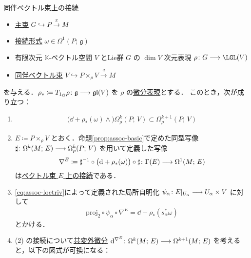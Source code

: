 \documentclass[geometry_main]{subfiles}
\begin{document}
\begin{mytheo}[label=thm:connection-assoc,breakable]{同伴ベクトル束上の接続}
    \begin{itemize}
        \item \hyperref[def.PFD]{主束} $G \hookrightarrow P \xrightarrow{\pi} M$
        \item \hyperref[def:connection]{接続形式} $\omega \in \Omega^1(P;\, \mathfrak{g})$
        \item 有限次元 $\mathbb{K}$-ベクトル空間 $V$ とLie群 $G$ の $\dim V$ 次元表現 $\rho \colon G \lto \LGL (V)$ 
        \item \hyperref[def:associated-vect]{同伴ベクトル束} $V \hookrightarrow P \times_\rho V \xrightarrow{q} M$
    \end{itemize}
    を与える．$\rho_* \coloneqq T_{1_G} \rho \colon \mathfrak{g} \longrightarrow \mathfrak{gl}(V)$ を $\rho$ の\hyperref[def:diff-rep]{微分表現}とする．
    このとき，次が成り立つ：
    \begin{enumerate}
        \item \begin{align}
            \bigl(\dd + \rho_* (\omega) \wedge\bigr) \Omega^k_\rho(P;\, V) \subset \Omega^{k+1}_\rho (P;\, V)
        \end{align}
        \item $E \coloneqq P \times_\rho V$ とおく．命題\ref{prop:assoc-basic}で定めた同型写像 $\sharp \colon \Omega^k(M;\, E) \longrightarrow \Omega^k_\rho(P;\, V)$ を用いて定義した写像
        \begin{align}
            \nabla^E \coloneqq \sharp^{-1} \circ \bigl(\dd + \rho_*(\omega) \bigr) \circ \sharp\colon \Gamma(E) \longrightarrow \Omega^1(M;\, E)
        \end{align}
        は\hyperref[def:connection-vect]{ベクトル束 $E$ 上の接続}である．
        \item \eqref{eq:assoc-loctriv}によって定義された局所自明化 $\psi_\alpha \colon E|_{U_\alpha} \longrightarrow U_\alpha \times V$ に対して
        \begin{align}
            \mathrm{proj}_2 \circ \psi_\alpha \circ \nabla^E = \dd + \rho_* (s_\alpha^* \omega)
        \end{align}
        とかける．
        \item (2) の接続について\hyperref[def:connection-vect]{共変外微分} $\dd^{\nabla^E} \colon \Omega^k(M;\, E) \longrightarrow \Omega^{k+1}(M;\, E)$
        を考えると，以下の図式が可換になる：
        \begin{center}
        \end{center}
        
    \end{enumerate}
    
\end{mytheo}
\end{document}
